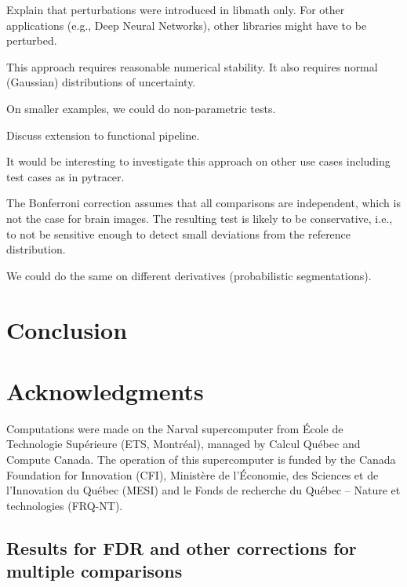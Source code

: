 \documentclass{article}
\begin{document}
Explain that perturbations were introduced in libmath only. For other
applications (e.g., Deep Neural Networks), other libraries might have to be
perturbed.

This approach requires reasonable numerical stability. It also requires normal
(Gaussian) distributions of uncertainty.

On smaller examples, we could do non-parametric tests.

Discuss extension to functional pipeline.

It would be interesting to investigate this approach on other use cases
including test cases as in pytracer.

The Bonferroni correction assumes that all comparisons are independent, which is
not the case for brain images. The resulting test is likely to be conservative,
i.e., to not be sensitive enough to detect small deviations from the reference
distribution.

We could do the same on different derivatives (probabilistic segmentations).

\section{Conclusion}
\section{Acknowledgments}

Computations were made on the Narval supercomputer from \'Ecole de Technologie
Sup\'erieure (ETS, Montr\'eal), managed by Calcul Québec and Compute Canada. The
operation of this supercomputer is funded by the Canada Foundation for
Innovation (CFI), Ministère de l’Économie, des Sciences et de l’Innovation du
Québec (MESI) and le Fonds de recherche du Québec – Nature et technologies
(FRQ-NT).


\begin{appendices}
    \section{Results for FDR and other corrections for multiple comparisons}
    \label{appendix:multiple-comparison-tests}
\end{appendices}




\end{document}
